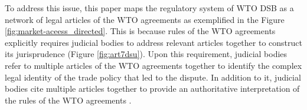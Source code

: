 To address this issue, 
this paper maps 
the regulatory system of WTO DSB 
as a network of legal articles 
of the WTO agreements as exemplified in the Figure \ref{fig:market-aceess_directed}. 
This is because rules of the WTO agreements
explicitly requires judicial bodies to address 
relevant articles together to construct its jurisprudence (Figure \ref{fig:art7dsu}).
Upon this requirement, judicial bodies refer to 
multiple articles of the WTO agreements together
to identify the complex legal identity of the trade policy that led to the dispute.
In addition to it, judicial bodies cite multiple articles together 
to provide an authoritative interpretation of the rules of the WTO agreements
\citep{oesch2003standards}.






